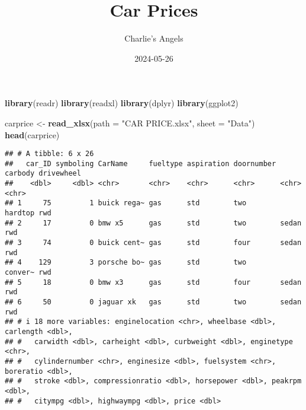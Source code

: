 \documentclass[
]{article}
\title{Car Prices}
\author{Charlie's Angels}
\date{2024-05-26}
\newenvironment{Shaded}{\begin{snugshade}}{\end{snugshade}}
\newcommand{\AttributeTok}[1]{\textcolor[rgb]{0.13,0.29,0.53}{#1}}
\newcommand{\ConstantTok}[1]{\textcolor[rgb]{0.56,0.35,0.01}{#1}}
\newcommand{\FunctionTok}[1]{\textcolor[rgb]{0.13,0.29,0.53}{\textbf{#1}}}
\newcommand{\NormalTok}[1]{#1}
\newcommand{\OtherTok}[1]{\textcolor[rgb]{0.56,0.35,0.01}{#1}}
\newcommand{\SpecialCharTok}[1]{\textcolor[rgb]{0.81,0.36,0.00}{\textbf{#1}}}
\newcommand{\StringTok}[1]{\textcolor[rgb]{0.31,0.60,0.02}{#1}}
\begin{document}
\maketitle

\begin{Shaded}
\end{Shaded}

\begin{Shaded}
\begin{Highlighting}[]
\FunctionTok{library}\NormalTok{(readr)}
\FunctionTok{library}\NormalTok{(readxl)}
\FunctionTok{library}\NormalTok{(dplyr)}
\FunctionTok{library}\NormalTok{(ggplot2)}
\end{Highlighting}
\end{Shaded}

\begin{Shaded}
\begin{Highlighting}[]
\NormalTok{carprice }\OtherTok{\textless{}{-}} \FunctionTok{read\_xlsx}\NormalTok{(}\AttributeTok{path =} \StringTok{"CAR PRICE.xlsx"}\NormalTok{, }\AttributeTok{sheet =} \StringTok{"Data"}\NormalTok{)}
\FunctionTok{head}\NormalTok{(carprice)}
\end{Highlighting}
\end{Shaded}

\begin{verbatim}
## # A tibble: 6 x 26
##   car_ID symboling CarName     fueltype aspiration doornumber carbody drivewheel
##    <dbl>     <dbl> <chr>       <chr>    <chr>      <chr>      <chr>   <chr>     
## 1     75         1 buick rega~ gas      std        two        hardtop rwd       
## 2     17         0 bmw x5      gas      std        two        sedan   rwd       
## 3     74         0 buick cent~ gas      std        four       sedan   rwd       
## 4    129         3 porsche bo~ gas      std        two        conver~ rwd       
## 5     18         0 bmw x3      gas      std        four       sedan   rwd       
## 6     50         0 jaguar xk   gas      std        two        sedan   rwd       
## # i 18 more variables: enginelocation <chr>, wheelbase <dbl>, carlength <dbl>,
## #   carwidth <dbl>, carheight <dbl>, curbweight <dbl>, enginetype <chr>,
## #   cylindernumber <chr>, enginesize <dbl>, fuelsystem <chr>, boreratio <dbl>,
## #   stroke <dbl>, compressionratio <dbl>, horsepower <dbl>, peakrpm <dbl>,
## #   citympg <dbl>, highwaympg <dbl>, price <dbl>
\end{verbatim}
\end{document}
